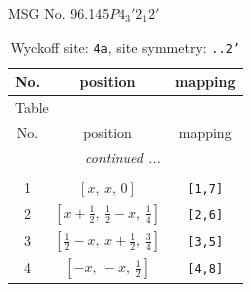 \documentclass[fleqn,8pt]{jsarticle}
\begin{document}
\setcounter{MaxMatrixCols}{32}

\renewcommand{\tablename}{Table~}
\renewcommand{\figurename}{Figure~}
\begin{center}
\LARGE
MSG No. 96.145\quad$P4_{3}'2_{1}2'$
\end{center}
\renewcommand{\arraystretch}{1.2}
\begin{longtable}{ccc}
\caption{Wyckoff site: {\tt 4a}, site symmetry: {\tt ..2'}}
 \\
 \hline \hline
No. & position & mapping \\ \hline \endfirsthead

\multicolumn{2}{l}{\tablename\ \thetable{}} \\
 \hline \hline
No. & position & mapping \\ \hline \endhead

 \hline \hline
\multicolumn{2}{r}{\footnotesize\it continued ...} \\ \endfoot

 \hline \hline
\multicolumn{2}{r}{} \\ \endlastfoot

1 & $\left[ x,\, x,\, 0 \right]$ & {\tt [1,7]} \\ \hline
2 & $\left[ x + \frac{1}{2},\, \frac{1}{2} - x,\, \frac{1}{4} \right]$ & {\tt [2,6]} \\ \hline
3 & $\left[ \frac{1}{2} - x,\, x + \frac{1}{2},\, \frac{3}{4} \right]$ & {\tt [3,5]} \\ \hline
4 & $\left[ - x,\, - x,\, \frac{1}{2} \right]$ & {\tt [4,8]} \\
\end{longtable}
\renewcommand{\arraystretch}{1.2}
\end{document}
